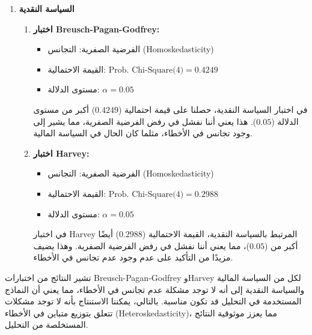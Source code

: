 \documentclass[10pt,a4paper]{report}
\begin{document}
\begin{doublespacing}
\begin{enumerate}
\begin{enumerate}
		\item \textbf{اختبار Harvey:}
		\begin{itemize}
			\item الفرضية الصفرية: {التجانس (Homoskedasticity)}
			\item القيمة الاحتمالية: $\text{Prob. Chi-Square(4)} = 0.3186$
			\item مستوى الدلالة: $\alpha = 0.05$
		\end{itemize}
		أيضًا في اختبار \textenglish{Harvey}، القيمة الاحتمالية ($0.3186$) أكبر من ($0.05$)، مما يعني أننا نفشل في رفض الفرضية الصفرية. وهذا يدعم ما توصلنا إليه في اختبار \textenglish{Breusch-Pagan-Godfrey}، حيث تشير النتائج إلى عدم وجود عدم تجانس في الأخطاء.
	\end{enumerate}
	
	\item \textbf{السياسة النقدية}
	\begin{enumerate}
		\item \textbf{اختبار Breusch-Pagan-Godfrey:}
		\begin{itemize}
			\item الفرضية الصفرية: {التجانس (Homoskedasticity)}
			\item القيمة الاحتمالية: $\text{Prob. Chi-Square(4)} = 0.4249$
			\item مستوى الدلالة: $\alpha = 0.05$
		\end{itemize}
		في اختبار السياسة النقدية، حصلنا على قيمة احتمالية ($0.4249$) أكبر من مستوى الدلالة ($0.05$). هذا يعني أننا نفشل في رفض الفرضية الصفرية، مما يشير إلى وجود تجانس في الأخطاء، مثلما كان الحال في السياسة المالية.
		
		\item \textbf{اختبار Harvey:}
		\begin{itemize}
			\item الفرضية الصفرية: {التجانس (Homoskedasticity)}
			\item القيمة الاحتمالية: $\text{Prob. Chi-Square(4)} = 0.2988$
			\item مستوى الدلالة: $\alpha = 0.05$
		\end{itemize}
		في اختبار \textenglish{Harvey} المرتبط بالسياسة النقدية، القيمة الاحتمالية ($0.2988$) أيضًا أكبر من ($0.05$)، مما يعني أننا نفشل في رفض الفرضية الصفرية. وهذا يضيف مزيدًا من التأكيد على عدم وجود عدم تجانس في الأخطاء.
	\end{enumerate}
\end{enumerate}

تشير النتائج من اختبارات \textenglish{Breusch-Pagan-Godfrey} و\textenglish{Harvey} لكل من السياسة المالية والسياسة النقدية إلى أنه لا توجد مشكلة عدم تجانس في الأخطاء، مما يعني أن النماذج المستخدمة في التحليل قد تكون مناسبة. بالتالي، يمكننا الاستنتاج بأنه لا توجد مشكلات تتعلق بتوزيع متباين في الأخطاء (\textenglish{Heteroskedasticity})، مما يعزز موثوقية النتائج المستخلصة من التحليل.


\end{doublespacing}
\end{document}
